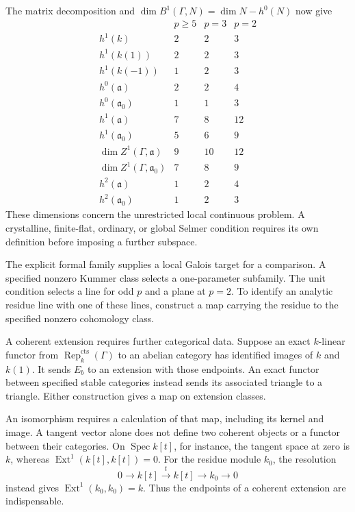 The matrix decomposition and
\(\dim B^1(\Gamma,N)=\dim N-h^0(N)\) now give
\[
\begin{array}{c|ccc}
 &p\ge5&p=3&p=2\\\hline
 h^1(k)&2&2&3\\
 h^1(k(1))&2&2&3\\
 h^1(k(-1))&1&2&3\\
 h^0(\mathfrak a)&2&2&4\\
 h^0(\mathfrak a_0)&1&1&3\\
 h^1(\mathfrak a)&7&8&12\\
 h^1(\mathfrak a_0)&5&6&9\\
 \dim Z^1(\Gamma,\mathfrak a)&9&10&12\\
 \dim Z^1(\Gamma,\mathfrak a_0)&7&8&9\\
 h^2(\mathfrak a)&1&2&4\\
 h^2(\mathfrak a_0)&1&2&3
\end{array}
\]
These dimensions concern the unrestricted local continuous problem.
A crystalline, finite-flat, ordinary, or global Selmer condition requires
its own definition before imposing a further subspace.

The explicit formal family supplies a local Galois target for a
comparison. A specified nonzero Kummer class selects a one-parameter
subfamily. The unit condition selects a line for odd \(p\) and a plane
at \(p=2\). To identify an analytic residue line with one of these lines,
construct a map carrying the residue to the specified nonzero cohomology class.

A coherent extension requires further categorical data.
Suppose an exact \(k\)-linear functor from
\(\operatorname{Rep}^{\mathrm{cts}}_k(\Gamma)\) to an abelian category
has identified images of \(k\) and \(k(1)\).
It sends \(E_b\) to an extension with those endpoints. An exact functor between specified
stable categories instead sends its associated triangle to a triangle.
Either construction gives a map on extension classes.

An isomorphism
requires a calculation of that map, including its kernel and image.
A tangent vector alone does not define two coherent objects or a functor
between their categories. On \(\operatorname{Spec}k[t]\), for instance,
the tangent space at zero is \(k\), whereas
\(\operatorname{Ext}^1(k[t],k[t])=0\). For the residue module \(k_0\),
the resolution
\[
 0\longrightarrow k[t]\xrightarrow{t}k[t]\longrightarrow k_0\longrightarrow0
\]
instead gives \(\operatorname{Ext}^1(k_0,k_0)=k\).
Thus the endpoints of a coherent extension are indispensable.

